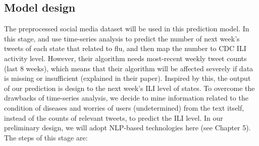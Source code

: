 \subsection{Model design}
\label{sec:First round predictor design}
The preprocessed social media dataset will be used in this prediction model. In this stage, \cite{elkin2017network} and \cite{serban2019real} use time-series analysis to predict the number of next week's tweets of each state that related to flu, and then map the number to CDC ILI activity level. However, their algorithm needs most-recent weekly tweet counts (last 8 weeks), which means that their algorithm will be affected severely if data is missing or insufficient (explained in their paper). Inspired by this, the output of our prediction is design to the next week's ILI level of states. To overcome the drawbacks of time-series analysis, we decide to mine information related to the condition of diseases and worries of users (undetermined) from the text itself, instead of the counts of relevant tweets, to predict the ILI level. In our preliminary design, we will adopt NLP-based technologies here (see Chapter 5). The steps of this stage are:
